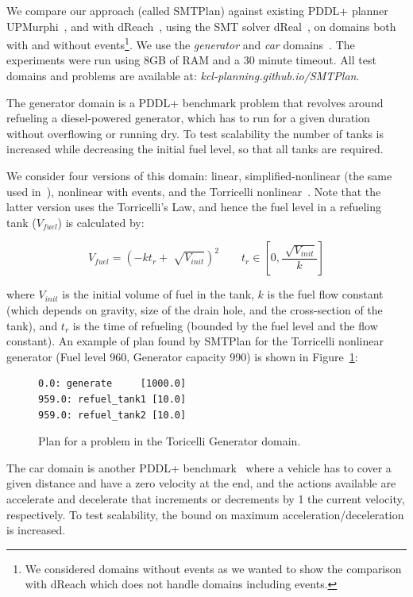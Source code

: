 We compare our approach (called SMTPlan) against existing PDDL+ planner UPMurphi~\cite{upmurphi}, and with dReach~\cite{bryce}, using the SMT solver dReal~\cite{gao12}, on domains both with and without events\footnote{We considered domains without events as we wanted to show the comparison with dReach which does not handle domains including events.}. We use the \textit{generator} and \textit{car} domains~\cite{bogomolov14}. The experiments were run using 8GB of RAM and a 30 minute timeout. All test domains and problems are available at: \textit{kcl-planning.github.io/SMTPlan}.

The generator domain is a PDDL+ benchmark problem that revolves around refueling a diesel-powered generator, which has to run for a given duration without overflowing or running dry. To test scalability the number of tanks is increased while decreasing the initial fuel level, so that all tanks are required.

We consider four versions of this domain: linear, simplified-nonlinear (the same used in~\cite{bryce}), nonlinear with events, and the Torricelli nonlinear~\cite{howey2003val}. Note that the latter version uses the Torricelli's Law, and hence the fuel level in a refueling tank ($V_{fuel}$) is calculated by:

\begingroup\makeatletter{}\check@mathfonts
\begin{equation}
	V_{fuel} = (-kt_r+\sqrt[]{V_{init}})^2 \qquad t_r \in \left[0, \frac{\sqrt[]{V_{init}}}{k}\right] 
\end{equation}
\label{vol_eq}
\endgroup

\noindent where $V_{init}$ is the initial volume of fuel in the tank, $k$ is the fuel flow constant (which depends on gravity, size of the drain hole, and the cross-section of the tank), and $t_r$ is the time of refueling (bounded by the fuel level and the flow constant). An example of plan found by SMTPlan for the Torricelli nonlinear generator (Fuel level 960, Generator capacity 990) is shown in Figure~\ref{fig:generatorplan}:

\begin{figure}[htb!]
\centering
\small
\begin{BVerbatim}
0.0: generate     [1000.0]
959.0: refuel_tank1 [10.0]
959.0: refuel_tank2 [10.0]
\end{BVerbatim}
\caption{Plan for a problem in the Toricelli Generator domain.}
\label{fig:generatorplan}
\end{figure}

The car domain is another PDDL+ benchmark~\cite{pddl+} where a vehicle has to cover a given distance and have a zero velocity at the end, and the actions available are accelerate and decelerate that increments or decrements by 1 the current velocity, respectively.
To test scalability, the bound on maximum acceleration/deceleration is increased.

